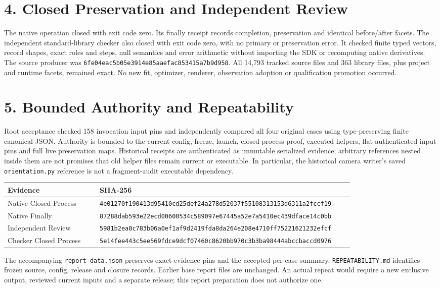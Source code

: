 \documentclass[11pt,a4paper]{article}
\newcommand{\code}[1]{{\small\nolinkurl{#1}}}
\newcommand{\hash}[1]{{\footnotesize\nolinkurl{#1}}}
\begin{document}
\section*{4. Closed Preservation and Independent Review}
The native operation closed with exit code zero. Its finally receipt records
completion, preservation and identical before/after facets. The independent
standard-library checker also closed with exit code zero, with no primary or
preservation error. It checked finite typed vectors, record shapes, exact roles
and steps, null semantics and error arithmetic without importing the SDK or
recomputing native derivatives.
The source producer was
\hash{6fe04eac5b05e3914e85aaefac853415a7b9d958}.
All 14,793 tracked source files and 363 library files, plus project and runtime
facets, remained exact. No new fit, optimizer, renderer, observation adoption or
qualification promotion occurred.

\newpage
\section*{5. Bounded Authority and Repeatability}
Root acceptance checked 158 invocation input pins and independently compared all
four original cases using type-preserving finite canonical JSON. Authority is
bounded to the current config, freeze, launch, closed-process proof, executed
helpers, flat authenticated input pins and full live preservation maps.
Historical receipts are authenticated as immutable serialized evidence; arbitrary
references nested inside them are not promises that old helper files remain
current or executable. In particular, the historical camera writer's saved
\code{orientation.py} reference is not a fragment-audit executable dependency.

\begin{center}\small
\begin{tabular}{@{}>{\raggedright\arraybackslash}p{0.25\linewidth}p{0.69\linewidth}@{}}\toprule
Evidence & SHA-256\\\midrule
Native Closed Process & \hash{4e01270f190413d95410cd25def24a278d52037f55108313153d6311a2fccf19}\\
Native Finally & \hash{87288dab593e22ecd00600534c589097e67445a52e7a5410ec439dface14c0bb}\\
Independent Review & \hash{5981b2ea0c783b06a0ef1af9d2419fda8da264e208e4710ff75221621232efcf}\\
Checker Closed Process & \hash{5e14fee443c5ee569fdce9dcf07460c8620bb970c3b3ba98444abccbaccd0976}\\\bottomrule
\end{tabular}\end{center}
The accompanying \code{report-data.json} preserves exact evidence pins and the
accepted per-case summary. \code{REPEATABILITY.md} identifies frozen source,
config, release and closure records. Earlier base report files are unchanged.
An actual repeat would require a new exclusive output, reviewed current inputs
and a separate release; this report preparation does not authorize one.
\end{document}

